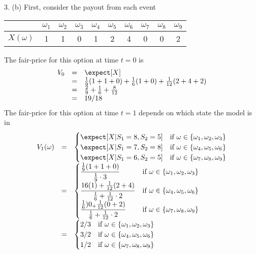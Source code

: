 \documentclass[11pt,a4paper]{article}
\begin{document}
\begin{answer}{3. (b)}
  First, consider the payout from each event
  \begin{center}
    \begin{tabular}{c|ccccccccc}
      &$\omega_1$&$\omega_2$&$\omega_3$&$\omega_4$&$\omega_5$&$\omega_6$&$\omega_7$&$\omega_8$&$\omega_9$\\\hline
      $X(\omega)$&1&1&0&1&2&4&0&0&2
    \end{tabular}
  \end{center}
  The fair-price for this option at time $t=0$ is
  \[\begin{array}{rcl}
    V_0&=&\expect[X]\\
    &=&\frac19(1+1+0)+\frac16(1+0)+\frac1{12}(2+4+2)\\
    &=&\frac29+\frac16+\frac8{12}\\
    &=&19/18
  \end{array}\]
  The fair-price for this option at time $t=1$ depends on which state the model is in
  \[\begin{array}{rcl}
    V_1(\omega)&=&\begin{cases}
        \expect[X|S_1=8,S_2=5]&\text{if }\omega\in\{\omega_1,\omega_2,\omega_3\}\\
        \expect[X|S_1=7,S_2=8]&\text{if }\omega\in\{\omega_4,\omega_5,\omega_6\}\\
        \expect[X|S_1=6,S_2=5]&\text{if }\omega\in\{\omega_7,\omega_8,\omega_9\}
    \end{cases}\\
    &=&\begin{cases}
        \dfrac{\frac19(1+1+0)}{\frac19\cdot3}&\text{if }\omega\in\{\omega_1,\omega_2,\omega_3\}\\
        \dfrac{16(1)+\frac1{12}(2+4)}{\frac16+\frac{1}{12}\cdot2}&\text{if }\omega\in\{\omega_4,\omega_5,\omega_6\}\\
        \dfrac{\frac16)0_+\frac1{12}(0+2)}{\frac16+\frac1{12}\cdot2}&\text{if }\omega\in\{\omega_7,\omega_8,\omega_9\}
    \end{cases}\\
    &=&\begin{cases}
        2/3&\text{if }\omega\in\{\omega_1,\omega_2,\omega_3\}\\
        3/2&\text{if }\omega\in\{\omega_4,\omega_5,\omega_6\}\\
        1/2&\text{if }\omega\in\{\omega_7,\omega_8,\omega_9\}
    \end{cases}\\
  \end{array}\]
\end{answer}
\end{document}
